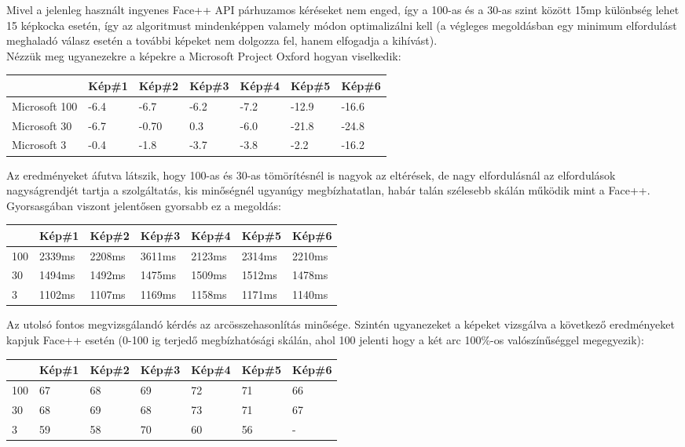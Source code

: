 Mivel a jelenleg használt ingyenes Face++ API párhuzamos kéréseket nem enged, így a 100-as és a 30-as szint között 15mp különbség lehet 15 képkocka esetén, így az algoritmust mindenképpen valamely módon optimalizálni kell (a végleges megoldásban egy minimum elfordulást meghaladó válasz esetén a további képeket nem dolgozza fel, hanem elfogadja a kihívást).
\\Nézzük meg ugyanezekre a képekre a Microsoft Project Oxford hogyan viselkedik:
\begin{center}
	\begin{tabular}{|p{2cm}|p{} |p{} | p{}|p{}|p{}|p{}|}
   	\hline
	 & Kép\#1 & Kép\#2& Kép\#3&Kép\#4 &Kép\#5 &Kép\#6\\ \hline
	Microsoft 100 & -6.4 & -6.7 & -6.2 & -7.2 & -12.9 & -16.6 \\ \hline
	Microsoft 30 & -6.7 & -0.70 & 0.3 & -6.0 & -21.8 & -24.8 \\ \hline
	Microsoft 3 & -0.4 & -1.8 & -3.7 & -3.8 & -2.2 & -16.2\\ \hline
	\end{tabular}
\end{center}

Az eredményeket áfutva látszik, hogy 100-as és 30-as tömörítésnél is nagyok az eltérések, de nagy elfordulásnál az elfordulások nagyságrendjét tartja a szolgáltatás, kis minőségnél ugyanúgy megbízhatatlan, habár talán szélesebb skálán működik mint a Face++. Gyorsasgában viszont jelentősen gyorsabb ez a megoldás: 
\begin{center}
	\begin{tabular}{|p{1cm}|p{} |p{} | p{}|p{}|p{}|p{}|}
   	\hline
	 & Kép\#1 & Kép\#2& Kép\#3&Kép\#4 &Kép\#5 &Kép\#6\\ \hline
	100 & 2339ms & 2208ms & 3611ms & 2123ms &2314ms & 2210ms \\ \hline
	30 & 1494ms & 1492ms & 1475ms & 1509ms & 1512ms & 1478ms \\ \hline
	3 & 1102ms & 1107ms & 1169ms & 1158ms & 1171ms & 1140ms\\ \hline
	\end{tabular}
\end{center}

Az utolsó fontos megvizsgálandó kérdés az arcösszehasonlítás minősége. Szintén ugyanezeket a képeket vizsgálva a következő eredményeket kapjuk Face++ esetén (0-100 ig terjedő megbízhatósági skálán, ahol 100 jelenti hogy a két arc 100\%-os valószínűséggel megegyezik):
\begin{center}
	\begin{tabular}{|p{2cm}|p{} |p{} | p{}|p{}|p{}|p{}|}
   	\hline
	 & Kép\#1 & Kép\#2& Kép\#3&Kép\#4 &Kép\#5 &Kép\#6\\ \hline
	100 & 67 & 68 & 69 & 72 & 71 & 66 \\ \hline
	30 & 68 & 69 & 68 &73 & 71 & 67 \\ \hline
	3 & 59 & 58 & 70 & 60 & 56 & -\\ \hline
	\end{tabular}
\end{center}

